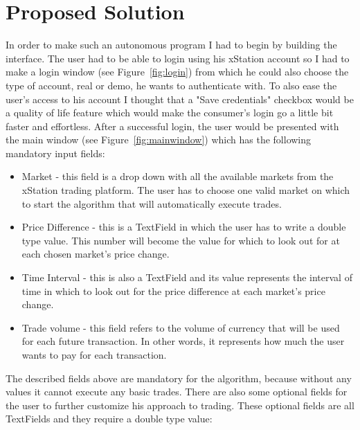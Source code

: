 \documentclass[12pt,a4paper]{report}
\begin{document}
\chapter{Proposed Solution}
In order to make such an autonomous program I had to begin by building the interface. The user had to be able to login using his xStation account so I had to make a login window (see Figure~\ref{fig:login}) from which he could also choose the type of account, real or demo, he wants to authenticate with. To also ease the user's access to his account I thought that a "Save credentials" checkbox would be a quality of life feature which would make the consumer's login go a little bit faster and effortless. After a successful login, the user would be presented with the main window (see Figure~\ref{fig:mainwindow}) which has the following mandatory input fields:
\begin{itemize}
	\item Market - this field is a drop down with all the available markets from the xStation trading platform. The user has to choose one valid market on which to start the algorithm that will automatically execute trades. 
	\item Price Difference - this is a TextField in which the user has to write a double type value. This number will become the value for which to look out for at each chosen market's price change.
	\item Time Interval - this is also a TextField and its value represents the interval of time in which to look out for the price difference at each market's price change.
	\item Trade volume - this field refers to the volume of currency that will be used for each future transaction. In other words, it represents how much the user wants to pay for each transaction.
\end{itemize}
The described fields above are mandatory for the algorithm, because without any values it cannot execute any basic trades. There are also some optional fields for the user to further customize his approach to trading. These optional fields are all TextFields and they require a double type value:
\end{document}
